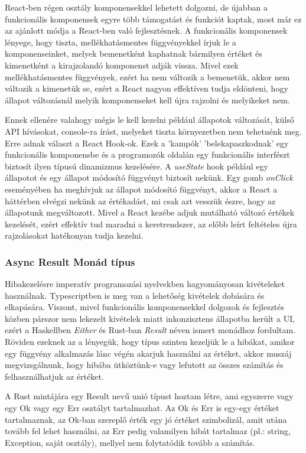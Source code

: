 React-ben régen osztály komponensekkel lehetett dolgozni, de újabban a funkcionális komponensek egyre több támogatást és funkciót kaptak, most már ez az ajánlott módja a React-ben való fejlesztésnek. A funkcionális komponensek lényege, hogy tiszta, mellékhatásmentes függvényekkel írjuk le a komponenseinket, melyek bemenetként kaphatnak bármilyen értéket és kimenetként a kirajzolandó komponenst adják vissza. Mivel ezek mellékhatásmentes függvények, ezért ha nem változik a bemenetük, akkor nem változik a kimenetük se, ezért a React nagyon effektíven tudja eldönteni, hogy állapot változásnál melyik komponenseket kell újra rajzolni és melyikeket nem.

Ennek ellenére valahogy mégis le kell kezelni például állapotok változását, külső API hívásokat, console-ra írást, melyeket tiszta környezetben nem tehetnénk meg. Erre adnak választ a React Hook-ok. Ezek a 'kampók' 'belekapaszkodnak' egy funkcionális komponensbe és a programozók oldalán egy funkcionális interfészt biztosít ilyen típusú dinamizmus kezelésére. A \textit{useState} hook például egy állapotot és egy állapot módosító függvényt biztosít nekünk. Egy gomb \textit{onClick} eseményében ha meghívjuk az állapot módosító függvényt, akkor a React a háttérben elvégzi nekünk az értékadást, mi csak azt vesszük észre, hogy az állapotunk megváltozott. Mivel a React kezébe adjuk mutálható változó értékek kezelését, ezért effektív tud maradni a keretrendszer, az előbb leírt feltételes újra rajzolásokat hatékonyan tudja kezelni.

\subsubsection{Async Result Monád típus}

Hibakezelésre imperatív programozási nyelvekben hagyományosan kivételeket használnak. Typescriptben is meg van a lehetőség kivételek dobására és elkapására. Viszont, mivel funkcionális komponensekkel dolgozok és fejlesztés közben párszor nem lekezelt kivételek miatt inkonzisztens állapotba került a UI, ezért a Haskellben \textit{Either} és Rust-ban \textit{Result} néven ismert monádhoz fordultam. Röviden ezeknek az a lényegük, hogy típus szinten kezeljük le a hibákat, amikor egy függvény alkalmazás lánc végén akarjuk használni az értéket, akkor muszáj megvizsgálnunk, hogy hibába ütköztünk-e vagy lefutott az összes számítás és felhasználhatjuk az értéket.

A Rust mintájára egy Result nevű unió típust\cite{tsUnionTypes} hoztam létre, ami egyszerre vagy egy Ok vagy egy Err osztályt tartalmazhat. Az Ok és Err is egy-egy értéket tartalmaznak, az Ok-ban szereplő érték egy jó értéket szimbolizál, amit utána tovább fel lehet használni, az Err pedig valamilyen hibát tartalmaz (pl.: string, Exception, saját osztály), mellyel nem folytatódik tovább a számítás.

